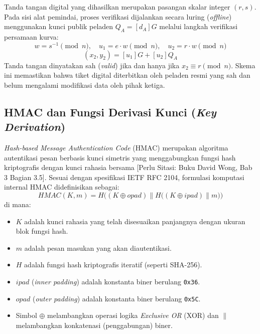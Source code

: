 Tanda tangan digital yang dihasilkan merupakan pasangan skalar integer $(r, s)$. Pada sisi alat pemindai, proses verifikasi dijalankan secara luring (\textit{offline}) menggunakan kunci publik peladen $Q_A = [d_A]G$ melalui langkah verifikasi persamaan kurva:
\begin{equation}
    w = s^{-1} \pmod n, \quad u_1 = e \cdot w \pmod n, \quad u_2 = r \cdot w \pmod n
\end{equation}
\begin{equation}
    (x_2, y_2) = [u_1]G + [u_2]Q_A
\end{equation}
Tanda tangan dinyatakan sah (\textit{valid}) jika dan hanya jika $x_2 \equiv r \pmod n$. Skema ini memastikan bahwa tiket digital diterbitkan oleh peladen resmi yang sah dan belum mengalami modifikasi data oleh pihak ketiga.

\subsection{HMAC dan Fungsi Derivasi Kunci (\textit{Key Derivation})}
\label{sec:hmac_kdf}
\textit{Hash-based Message Authentication Code} (HMAC) merupakan algoritma autentikasi pesan berbasis kunci simetris yang menggabungkan fungsi hash kriptografis dengan kunci rahasia bersama [Perlu Sitasi: Buku David Wong, Bab 3 Bagian 3.5]. Sesuai dengan spesifikasi IETF RFC 2104, formulasi komputasi internal HMAC didefinisikan sebagai:
\begin{equation}
    HMAC(K, m) = H\Big((K \oplus opad) \parallel H\big((K \oplus ipad) \parallel m\big)\Big)
\end{equation}
di mana:
\begin{itemize}
    \item $K$ adalah kunci rahasia yang telah disesuaikan panjangnya dengan ukuran blok fungsi hash.
    \item $m$ adalah pesan masukan yang akan diautentikasi.
    \item $H$ adalah fungsi hash kriptografis iteratif (seperti SHA-256).
    \item $ipad$ (\textit{inner padding}) adalah konstanta biner berulang \texttt{0x36}.
    \item $opad$ (\textit{outer padding}) adalah konstanta biner berulang \texttt{0x5C}.
    \item Simbol $\oplus$ melambangkan operasi logika \textit{Exclusive OR} (XOR) dan $\parallel$ melambangkan konkatenasi (penggabungan) biner.
\end{itemize}


